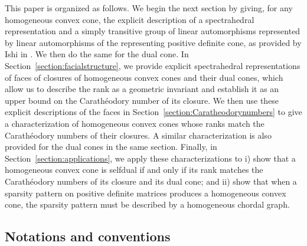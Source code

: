\documentclass[oneside]{amsart}
\theoremstyle{plain}
\theoremstyle{definition}
\theoremstyle{remark}
\numberwithin{equation}{section}
\begin{document}
This paper is organized as follows. We begin the next section by giving,
for any homogeneous convex cone, the explicit description of a
spectrahedral representation and a simply transitive group of linear
automorphisms represented by linear automorphisms of the representing
positive definite cone, as provided by Ishi in \cite{Ishi15}. We then do
the same for the dual cone. In Section~\ref{section:facialstructure}, we
provide explicit spectrahedral representations of faces of closures of
homogeneous convex cones and their dual cones, which allow us to describe
the rank as a geometric invariant and establish it as an upper bound on the
Carath\'eodory number of its closure. We then use these explicit
descriptions of the faces in Section~\ref{section:Caratheodorynumbers} to
give a characterization of homogeneous convex cones whose ranks match the
Carath\'eodory numbers of their closures. A similar characterization is
also provided for the dual cones in the same section. Finally, in
Section~\ref{section:applications}, we apply these characterizations to i)
show that a homogeneous convex cone is selfdual if and only if its rank
matches the Carath\'eodory numbers of its closure and its dual cone; and
ii) show that when a sparsity pattern on positive definite matrices
produces a homogeneous convex cone, the sparsity pattern must be described
by a homogeneous chordal graph.

\subsection{Notations and conventions}
\label{section:notations}
\end{document}
